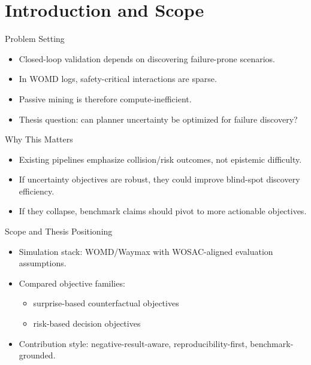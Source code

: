\section{Introduction and Scope}

\begin{frame}{Problem Setting}
\begin{itemize}
    \item Closed-loop validation depends on discovering failure-prone scenarios.
    \item In WOMD logs, safety-critical interactions are sparse.
    \item Passive mining is therefore compute-inefficient.
    \item Thesis question: can planner uncertainty be optimized for failure discovery?
\end{itemize}
\end{frame}

\begin{frame}{Why This Matters}
\begin{itemize}
    \item Existing pipelines emphasize collision/risk outcomes, not epistemic difficulty.
    \item If uncertainty objectives are robust, they could improve blind-spot discovery efficiency.
    \item If they collapse, benchmark claims should pivot to more actionable objectives.
\end{itemize}
\end{frame}

\begin{frame}{Scope and Thesis Positioning}
\begin{itemize}
    \item Simulation stack: WOMD/Waymax with WOSAC-aligned evaluation assumptions.
    \item Compared objective families:
    \begin{itemize}
        \item surprise-based counterfactual objectives
        \item risk-based decision objectives
    \end{itemize}
    \item Contribution style: negative-result-aware, reproducibility-first, benchmark-grounded.
\end{itemize}
\end{frame}
